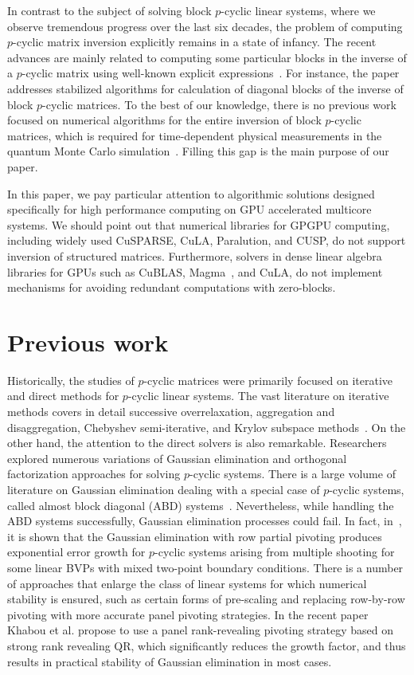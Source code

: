 \documentclass{llncs}
\newcommand{\Blas}{{\sc BLAS}\xspace}
\newcommand{\CuBlas}{{\sc Cu\Blas}\xspace}
\newcommand{\CuSparse}{{\sc CuSPARSE}\xspace}
\newcommand{\Magma}{{\sc Magma}\xspace}
\newcommand{\Cula}{{\sc CuLA}\xspace}
\newcommand{\Paralution}{{\sc Paralution}\xspace}
\newcommand{\Cusp}{{\sc CUSP}\xspace}
\begin{document}
In contrast to the subject of solving block $p$-cyclic linear systems, 
where we observe tremendous progress over the last six decades,
the problem of computing $p$-cyclic matrix inversion explicitly remains in 
a state of infancy. The recent advances are mainly related to 
computing some particular blocks in the inverse of a $p$-cyclic matrix
using well-known explicit expressions~\cite{Bai09,Tomas12}.
For instance, the paper~\cite{Tomas12} addresses stabilized algorithms for 
calculation of diagonal blocks of the inverse of block $p$-cyclic matrices. 
To the best of our knowledge, there is no previous work 
focused on numerical algorithms for the entire inversion of 
block $p$-cyclic matrices, which is required for 
time-dependent physical measurements in the quantum Monte Carlo 
simulation~\cite{Bai09}.
Filling this gap is the main purpose of our paper. 

In this paper, we pay particular attention to 
algorithmic solutions designed specifically for high performance computing 
on GPU accelerated multicore systems.
We should point out that numerical libraries for GPGPU computing,
including widely used 
\CuSparse, \Cula, \Paralution, and \Cusp, 
do not support inversion of structured matrices.
Furthermore, solvers in dense linear algebra libraries for GPUs 
such as \CuBlas,
\Magma~\cite{Tomov10Magma}, and \Cula,
do not implement mechanisms for avoiding redundant 
computations with zero-blocks.

\section{Previous work} 
\label{sec:background}

Historically, the studies of $p$-cyclic matrices
were primarily focused on iterative and direct methods for 
$p$-cyclic linear systems. The vast literature on iterative methods 
covers in detail successive overrelaxation,
aggregation and disaggregation,
Chebyshev semi-iterative, 
and Krylov subspace methods~\cite{Ernst00}.
On the other hand, the attention to the direct solvers 
is also remarkable.
Researchers explored numerous variations of Gaussian elimination and 
orthogonal factorization approaches for solving $p$-cyclic systems.
There is a large volume of literature on Gaussian elimination
dealing with a special case of $p$-cyclic systems, 
called almost block diagonal (ABD) systems~\cite{Wright92BSOF}.
Nevertheless, 
while handling the ABD systems successfully, 
Gaussian elimination processes could fail.
In fact, in~\cite{Wright93}, it is shown that 
the Gaussian elimination with row partial pivoting
produces exponential error growth
for $p$-cyclic systems arising from multiple shooting for 
some linear BVPs with mixed two-point boundary conditions. 
There is a number of approaches that enlarge the class of linear systems
for which numerical stability is ensured, 
such as certain forms of pre-scaling
and replacing row-by-row pivoting with 
more accurate panel pivoting strategies.
In the recent paper~\cite{KhabouDGG13} Khabou et al.
propose to use a panel rank-revealing pivoting strategy 
based on strong rank revealing QR, 
which significantly reduces the growth factor, and 
thus results in practical stability of Gaussian elimination
in most cases.
\end{document}
